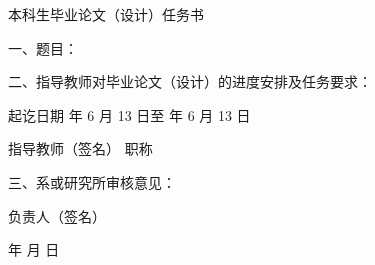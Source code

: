 {
\begin{center}
     \erhao \xingkai 本科生毕业论文（设计）任务书
\end{center}

\bfseries \fangsong

\noindent
一、题目： \thtitle

\noindent
二、指导教师对毕业论文（设计）的进度安排及任务要求：

{
    
}

\vspace{2cm}

\noindent
起讫日期 年 6 月 13 日\quad 至  年 6 月 13 日

\begin{flushright}
    指导教师（签名） \underline{\hspace{4cm}} 职称 \underline{\hspace{4cm}}
\end{flushright}

\noindent
三、系或研究所审核意见：

\vfill

\begin{flushright}
    负责人（签名） \underline{\hspace{4cm}}
    
    年 \hspace{1cm} 月 \hspace{1cm} 日
\end{flushright}
\thispagestyle{empty}
}